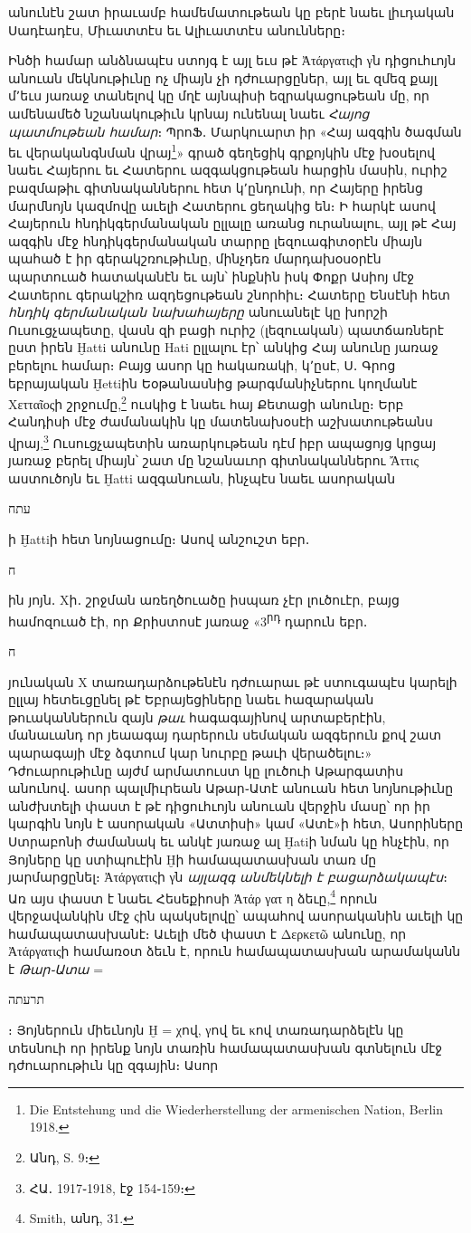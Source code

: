 \documentclass{article}
\begin{document}
{անունէն շատ իրաւամբ համեմատութեան կը բերէ նաեւ լիւդական Սադէադէս, Միւատտէս եւ Ալիւատտէս անունները։

Ինծի համար անձնապէս ստոյգ է այլ եւս թէ Ἀτάργατιςի γն դիցուհւոյն անուան մեկնութիւնը ոչ միայն չի դժուարցըներ, այլ եւ զմեզ քայլ մ՚եւս յառաջ տանելով կը մղէ այնպիսի եզրակացութեան մը, որ ամենամեծ նշանակութիւն կրնայ ունենալ նաեւ \emph{Հայոց պատմութեան համար}։ ՊրոՖ․ Մարկուարտ իր «Հայ ազգին ծագման եւ վերականգնման վրայ\footnote{Die Entstehung und die Wiederherstellung der armenischen Nation, Berlin 1918.}» գրած գեղեցիկ գրքոյկին մէջ խօսելով նաեւ Հայերու եւ Հատերու ազգակցութեան հարցին մասին, ուրիշ բազմաթիւ գիտնականներու հետ կ՚ընդունի, որ Հայերը իրենց մարմնոյն կազմովը աւելի Հատերու ցեղակից են։ Ի հարկէ ասով Հայերուն հնդիկգերմանական ըլլալը առանց ուրանալու, այլ թէ Հայ ազգին մէջ հնդիկգերմանական տարրը լեզուագիտօրէն միայն պահած է իր գերակշռութիւնը, մինչդեռ մարդախօսօրէն պարտուած հատականէն եւ այն՝ ինքնին իսկ Փոքր Ասիոյ մէջ Հատերու գերակշիռ ազդեցութեան շնորհիւ։ Հատերը Ենսէնի հետ \emph{հնդիկ գերմանական նախահայերը} անուանելէ կը խորշի Ուսուցչապետը, վասն զի բացի ուրիշ (լեզուական) պատճառներէ ըստ իրեն Ḫatti անունը Hati ըլլալու էր՝ անկից Հայ անունը յառաջ բերելու համար։ Բայց ասոր կը հակառակի, կ՚ըսէ, Ս․ Գրոց եբրայական Ḫettiին Եօթանասնից թարգմանիչներու կողմանէ Χετταῖοςի շրջումը,\footnote{Անդ, S. 9։} ուսկից է նաեւ հայ Քետացի անունը։ Երբ Հանդիսի մէջ ժամանակին կը մատենախօսէի աշխատութեանս վրայ,\footnote{ՀԱ․ 1917֊1918, էջ 154֊159։} Ուսուցչապետին առարկութեան դէմ իբր ապացոյց կրցայ յառաջ բերել միայն՝ շատ մը նշանաւոր գիտնականներու Ἄττις աստուծոյն եւ Ḫatti ազգանուան, ինչպէս նաեւ ասորական \begin{hebrewfont}עתח\end{hebrewfont}ի Ḫattiի հետ նոյնացումը։ Ասով անշուշտ եբր․ \begin{hebrewfont}ח\end{hebrewfont}ին յոյն․ Χի․ շրջման առեղծուածը իսպառ չէր լուծուէր, բայց համոզուած էի, որ Քրիստոսէ յառաջ «3\textsuperscript{րդ} դարուն եբր․ \begin{hebrewfont}ח\end{hebrewfont} յունական Χ տառադարձութենէն դժուարաւ թէ ստուգապէս կարելի ըլլայ հետեւցընել թէ Եբրայեցիները նաեւ հազարական թուականներուն զայն \emph{թաւ} հագագայինով արտաբերէին, մանաւանդ որ յեաագայ դարերուն սեմական ազգերուն քով շատ պարագայի մէջ ձգտում կար նուրբը թաւի վերածելու։» Դժուարութիւնը այժմ արմատուստ կը լուծուի Աթարգատիս անունով․ ասոր պալմիւրեան Աթար֊Ատէ անուան հետ նոյնութիւնը անժխտելի փաստ է թէ դիցուհւոյն անուան վերջին մասը՝ որ իր կարգին նոյն է ասորական «Ատտիսի» կամ «Ատէ»ի հետ, Ասորիները Ստրաբոնի ժամանակ եւ անկէ յառաջ ալ Ḫatiի նման կը հնչէին, որ Յոյները կը ստիպուէին Ḫի համապատասխան տառ մը յարմարցընել։ Ἀτάργατιςի γն \emph{այլազգ անմեկնելի է բացարձակապէս}։ Առ այս փաստ է նաեւ Հեսեքիոսի Ἀτάρ γατ η ձեւը,\footnote{Smith, անդ, 31.} որուն վերջավանկին մէջ ςին պակսելովը՝ ապահով ասորականին աւելի կը համապատասխանէ։ Աւելի մեծ փաստ է Δερκετῶ անունը, որ Ἀτάργατιςի համառօտ ձեւն է, որուն համապատասխան արամականն է \emph{Թար֊Ատա} = \begin{hebrewfont}תרעתה\end{hebrewfont}։ Յոյներուն միեւնոյն Ḫ = χով, γով եւ κով տառադարձելէն կը տեսնուի որ իրենք նոյն տառին համապատասխան գտնելուն մէջ դժուարութիւն կը զգային։ Ասոր }
\end{document}
